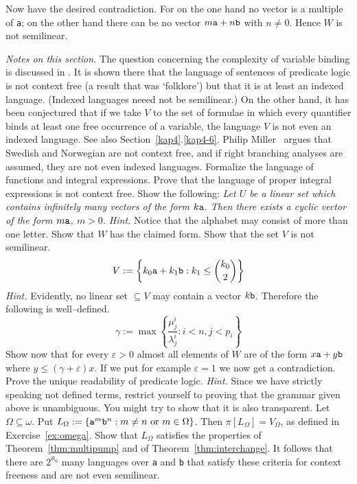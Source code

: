 Now have the desired contradiction. For on the one hand no vector
is a multiple of {\tt a}; on the other hand there can be no vector
$m\mbox{\tt a} + n \mbox{\tt b}$ with $n \neq 0$. Hence $W$ is not
semilinear.

{\it Notes on this section.} 
The question concerning the complexity of variable binding is discussed in 
\cite{marshpartee:binding}. It is shown there that the language of 
sentences of predicate logic is not context free (a result that was 
`folklore') but that it is at least an indexed language. (Indexed 
languages neeed not be semilinear.) On the other hand, it has been
conjectured that if we take $V$ to the set of formulae in which every 
quantifier binds at least one free occurrence of a variable, the 
language $V$ is not even an indexed language. See also 
Section~\ref{kap4}.\ref{kap4-6}. Philip
Miller~ 
argues that 
Swedish and Norwegian are not context free, and if right branching 
analyses are assumed, they are not even indexed languages. 
\vplatz
\exercise
Formalize the language of functions and integral expressions.
Prove that the language of proper integral expressions is not
context free.
\vplatz
\exercise
Show the following: {\it Let $U$ be a linear set which contains infinitely
many vectors of the form $k\mbox{\tt a}$. Then there exists a cyclic
vector of the form $m\mbox{\tt a}$, $m > 0$.} {\it Hint.} Notice
that the alphabet may consist of more than one letter.
\vplatz
\exercise
Show that $W$ has the claimed form.
\vplatz
\exercise
Show that the set $V$ is not semilinear.
\begin{equation}
V := \left\{ k_0 \mbox{\tt a} + k_1 \mbox{\tt b} :
k_1 \leq {{k_0}\choose 2}\right\}
\end{equation}
{\it Hint.} Evidently, no linear set $\subseteq V$ may contain
a vector $k \mbox{\tt b}$. Therefore the following is 
well--defined.
\begin{equation}
\gamma := \max \left\{\frac{\mu^i_j}{\lambda^i_j} :
i< n, j < p_i\right\}
\end{equation}
Show now that for every $\varepsilon > 0$ almost all elements of
$W$ are of the form $x\mbox{\tt a} + y \mbox{\tt b}$ where $y \leq
(\gamma + \varepsilon)x$. If we put for example $\varepsilon = 1$
we now get a contradiction.
\vplatz 
\exercise 
Prove the unique readability of predicate logic.
{\it Hint.} Since we have strictly speaking not defined terms,
restrict yourself to proving that the grammar given above is 
unambiguous. You might try to show that it is also transparent.
\vplatz
\exercise
Let $\Omega \subseteq \omega$. Put $L_{\Omega} := \{\mbox{\tt a}^m%
\mbox{\tt b}^n : m \neq n \text{ or } m \in \Omega\}$. Then 
$\pi[L_{\Omega}] = V_{\Omega}$, as defined in Exercise~\ref{ex:omega}. 
Show that $L_{\Omega}$ satisfies the properties of 
Theorem~\ref{thm:multipump} and of Theorem~\ref{thm:interchange}. 
It follows that there are $2^{\aleph_0}$ many languages over 
{\tt a} and {\tt b} that satisfy these criteria for context freeness 
and are not even semilinear. 
